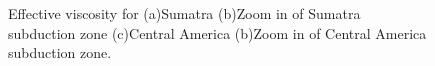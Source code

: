 \documentclass[12pt]{article}
\begin{document}
\begin{figure}[H]
\centering

\hspace{-1.0cm}
\hspace{0.1cm}
\hspace{0.2cm}
\hspace{0.2cm}
\caption{Effective viscosity for (a)Sumatra (b)Zoom in of Sumatra subduction zone (c)Central America (b)Zoom in of Central America subduction zone.}
\label{fig:visc_smaller}
\end{figure}
\end{document}

